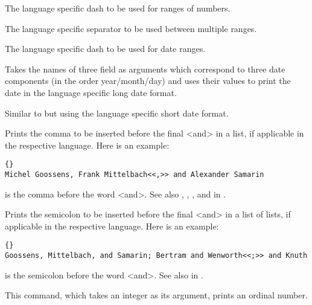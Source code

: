 \begin{ltxsyntax}


The language specific dash to be used for ranges of numbers.

\BiberOnlyMark

The language specific separator to be used between multiple ranges.


The language specific dash to be used for date ranges.


Takes the names of three field as arguments which correspond to three date components (in the order year\slash month\slash day) and uses their values to print the date in the language specific long date format.


Similar to  but using the language specific short date format.


Prints the comma to be inserted before the final <and> in a list, if applicable in the respective language. Here is an example:

\begin{lstlisting}[style=latex]{}
Michel Goossens, Frank Mittelbach<<,>> and Alexander Samarin
\end{lstlisting}
%
 is the comma before the word <and>. See also , , , and  in .


Prints the semicolon to be inserted before the final <and> in a list of lists, if applicable in the respective language. Here is an example:

\begin{lstlisting}[style=latex]{}
Goossens, Mittelbach, and Samarin; Bertram and Wenworth<<;>> and Knuth
\end{lstlisting}
%
 is the semicolon before the word <and>. See also  in .


This command, which takes an integer as its argument, prints an ordinal number.



\end{ltxsyntax}
